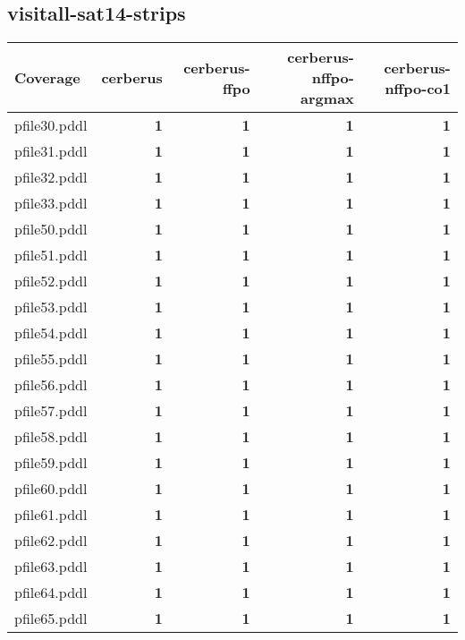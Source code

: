 \documentclass{article}
\begin{document}
\hypertarget{coverage-visitall-sat14-strips}{}
\subsection*{visitall-sat14-strips}

\begin{tabular}{@{}lrrrr@{}}
Coverage & cerberus & cerberus-ffpo & cerberus-nffpo-argmax & cerberus-nffpo-co1 \\
\midrule
pfile30.pddl & \textbf{1} & \textbf{1} & \textbf{1} & \textbf{1} \\
pfile31.pddl & \textbf{1} & \textbf{1} & \textbf{1} & \textbf{1} \\
pfile32.pddl & \textbf{1} & \textbf{1} & \textbf{1} & \textbf{1} \\
pfile33.pddl & \textbf{1} & \textbf{1} & \textbf{1} & \textbf{1} \\
pfile50.pddl & \textbf{1} & \textbf{1} & \textbf{1} & \textbf{1} \\
pfile51.pddl & \textbf{1} & \textbf{1} & \textbf{1} & \textbf{1} \\
pfile52.pddl & \textbf{1} & \textbf{1} & \textbf{1} & \textbf{1} \\
pfile53.pddl & \textbf{1} & \textbf{1} & \textbf{1} & \textbf{1} \\
pfile54.pddl & \textbf{1} & \textbf{1} & \textbf{1} & \textbf{1} \\
pfile55.pddl & \textbf{1} & \textbf{1} & \textbf{1} & \textbf{1} \\
pfile56.pddl & \textbf{1} & \textbf{1} & \textbf{1} & \textbf{1} \\
pfile57.pddl & \textbf{1} & \textbf{1} & \textbf{1} & \textbf{1} \\
pfile58.pddl & \textbf{1} & \textbf{1} & \textbf{1} & \textbf{1} \\
pfile59.pddl & \textbf{1} & \textbf{1} & \textbf{1} & \textbf{1} \\
pfile60.pddl & \textbf{1} & \textbf{1} & \textbf{1} & \textbf{1} \\
pfile61.pddl & \textbf{1} & \textbf{1} & \textbf{1} & \textbf{1} \\
pfile62.pddl & \textbf{1} & \textbf{1} & \textbf{1} & \textbf{1} \\
pfile63.pddl & \textbf{1} & \textbf{1} & \textbf{1} & \textbf{1} \\
pfile64.pddl & \textbf{1} & \textbf{1} & \textbf{1} & \textbf{1} \\
pfile65.pddl & \textbf{1} & \textbf{1} & \textbf{1} & \textbf{1} \\
\end{tabular}
\end{document}
